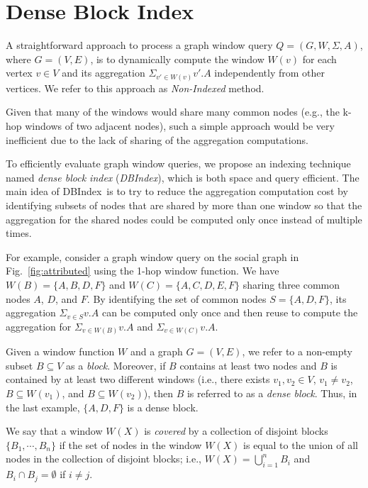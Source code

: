 
\newcommand{\DBIndex}{DBIndex}
\newcommand{\blockset}{{\cal B}}
\newcommand{\clusterset}{{\cal C}}

\section{Dense Block Index}
A straightforward approach to process a graph window query 
$Q = (G, W, \Sigma, A)$, where $G = (V,E)$,
is to dynamically compute the window $W(v)$ for each vertex $v \in V$ and
its aggregation 
$\Sigma_{v' \in W(v)} v'.A$ 
independently from other vertices. We refer to this approach as \emph{Non-Indexed} method.

Given that many of the windows would share many common nodes (e.g., the k-hop windows of two adjacent nodes),
such a simple approach would be very inefficient due to the lack of sharing of the aggregation computations. 

To efficiently evaluate graph window queries, we propose an indexing technique named \emph{dense block index} (\textit{\DBIndex}), which is both space and query efficient. 
The main idea of \DBIndex\ is to try to reduce the aggregation computation cost by identifying subsets of nodes that are shared by more than one window 
so that the aggregation for the shared nodes could be computed only once instead of multiple times.

For example, consider a graph window query on the social graph in Fig.~\ref{fig:attributed} using the 1-hop window function.
We have $W(B) = \{A,B,D,F\}$ and $W(C) = \{A,C,D,E,F\}$ sharing three common nodes $A$, $D$, and $F$.
By identifying the set of common nodes $S=\{A,D,F\}$, its aggregation 
$\Sigma_{v \in S} v.A$ can be computed only once
and then reuse to compute the aggregation for $\Sigma_{v \in W(B)} v.A$ and $\Sigma_{v \in W(C)} v.A$.

Given a window function $W$ and a graph $G=(V,E)$,
we refer to a non-empty subset $B \subseteq V$ as a {\it block}.
Moreover, if $B$ contains at least two nodes and $B$ is contained by at least two different windows
(i.e., there exists $v_1, v_2 \in V$, $v_1 \neq v_2$, $B \subseteq W(v_1)$, and $B \subseteq W(v_2)$),
then $B$ is referred to as a {\it dense block}.
Thus, in the last example, $\{A,D,F\}$ is a dense block.

We say that a window $W(X)$ is {\it covered} by a collection of disjoint blocks $\{B_1,\cdots,B_n\}$
if the set of nodes in the window $W(X)$ is equal to the union of all nodes in the collection of disjoint blocks;
i.e., $W(X) = \bigcup_{i=1}^{n} B_i$ and $B_i \cap B_j = \emptyset$ if $i \neq j$.

